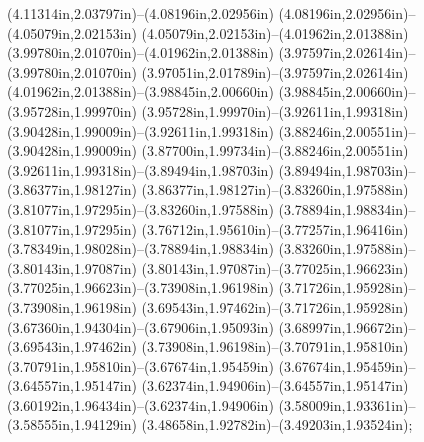 (4.11314in,2.03797in)--(4.08196in,2.02956in) (4.08196in,2.02956in)--(4.05079in,2.02153in) (4.05079in,2.02153in)--(4.01962in,2.01388in) (3.99780in,2.01070in)--(4.01962in,2.01388in) (3.97597in,2.02614in)--(3.99780in,2.01070in) (3.97051in,2.01789in)--(3.97597in,2.02614in) (4.01962in,2.01388in)--(3.98845in,2.00660in) (3.98845in,2.00660in)--(3.95728in,1.99970in) (3.95728in,1.99970in)--(3.92611in,1.99318in) (3.90428in,1.99009in)--(3.92611in,1.99318in) (3.88246in,2.00551in)--(3.90428in,1.99009in) (3.87700in,1.99734in)--(3.88246in,2.00551in) (3.92611in,1.99318in)--(3.89494in,1.98703in) (3.89494in,1.98703in)--(3.86377in,1.98127in) (3.86377in,1.98127in)--(3.83260in,1.97588in) (3.81077in,1.97295in)--(3.83260in,1.97588in) (3.78894in,1.98834in)--(3.81077in,1.97295in) (3.76712in,1.95610in)--(3.77257in,1.96416in) (3.78349in,1.98028in)--(3.78894in,1.98834in) (3.83260in,1.97588in)--(3.80143in,1.97087in) (3.80143in,1.97087in)--(3.77025in,1.96623in) (3.77025in,1.96623in)--(3.73908in,1.96198in) (3.71726in,1.95928in)--(3.73908in,1.96198in) (3.69543in,1.97462in)--(3.71726in,1.95928in) (3.67360in,1.94304in)--(3.67906in,1.95093in) (3.68997in,1.96672in)--(3.69543in,1.97462in) (3.73908in,1.96198in)--(3.70791in,1.95810in) (3.70791in,1.95810in)--(3.67674in,1.95459in) (3.67674in,1.95459in)--(3.64557in,1.95147in) (3.62374in,1.94906in)--(3.64557in,1.95147in) (3.60192in,1.96434in)--(3.62374in,1.94906in) (3.58009in,1.93361in)--(3.58555in,1.94129in) (3.48658in,1.92782in)--(3.49203in,1.93524in);
